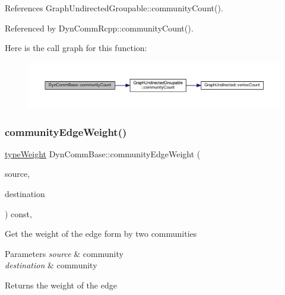 References Graph\+Undirected\+Groupable\+::community\+Count().



Referenced by Dyn\+Comm\+Rcpp\+::community\+Count().

Here is the call graph for this function\+:
\nopagebreak
\begin{figure}[H]
\begin{center}
\leavevmode
\includegraphics[width=350pt]{classDynCommBase_add5d1d59a3f20b4ba039342b31551fb3_cgraph}
\end{center}
\end{figure}
\mbox{\label{classDynCommBase_a1ef408ec71d82b008fc0229416c77b61}} 
\subsubsection{\texorpdfstring{community\+Edge\+Weight()}{communityEdgeWeight()}}
{\footnotesize\ttfamily \hyperlink{edge_8h_a2e7ea3be891ac8b52f749ec73fee6dd2}{type\+Weight} Dyn\+Comm\+Base\+::community\+Edge\+Weight (\begin{DoxyParamCaption}\item[{\hyperlink{graphUndirectedGroupable_8h_a914da95c9ea7f14f4b7f875c36818556}{type\+Community}}]{source,  }\item[{\hyperlink{graphUndirectedGroupable_8h_a914da95c9ea7f14f4b7f875c36818556}{type\+Community}}]{destination }\end{DoxyParamCaption}) const\hspace{0.3cm}{\ttfamily [inline]}, {\ttfamily [virtual]}}

Get the weight of the edge form by two communities


\begin{DoxyParams}{Parameters}
{\em source} & community \\
\hline
{\em destination} & community \\
\hline
\end{DoxyParams}
\begin{DoxyReturn}{Returns}
the weight of the edge 
\end{DoxyReturn}


